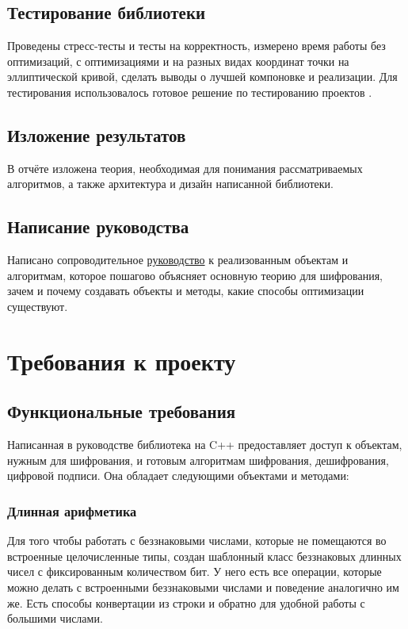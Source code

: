 \documentclass{article}
\begin{document}
\subsection*{Тестирование библиотеки}
Проведены стресс-тесты и тесты на корректность, измерено время работы без оптимизаций, с оптимизациями и на разных видах координат точки на эллиптической кривой, сделать выводы о лучшей компоновке и реализации. Для тестирования использовалось готовое решение по тестированию проектов \cite{googletest}.

\subsection*{Изложение результатов}
В отчёте изложена теория, необходимая для понимания рассматриваемых алгоритмов, а также архитектура и дизайн написанной библиотеки.

\subsection*{Написание руководства}
Написано сопроводительное \href{https://github.com/Hackerman-ru/Elliptic-Curve-Tutorial}{руководство} к реализованным объектам и алгоритмам, которое пошагово объясняет основную теорию для шифрования, зачем и почему создавать объекты и методы, какие способы оптимизации существуют.

\section{Требования к проекту}
\subsection{Функциональные требования}
Написанная в руководстве библиотека на C++ предоставляет доступ к объектам, нужным для шифрования, и готовым алгоритмам шифрования, дешифрования, цифровой подписи. Она обладает следующими объектами и методами:
\subsubsection{Длинная арифметика}
   Для того чтобы работать с беззнаковыми числами, которые не помещаются во встроенные целочисленные типы, создан шаблонный класс беззнаковых длинных чисел с фиксированным количеством бит. У него есть все операции, которые можно делать с встроенными беззнаковыми числами и поведение аналогично им же. Есть способы конвертации из строки и обратно для удобной работы с большими числами.
\end{document}
